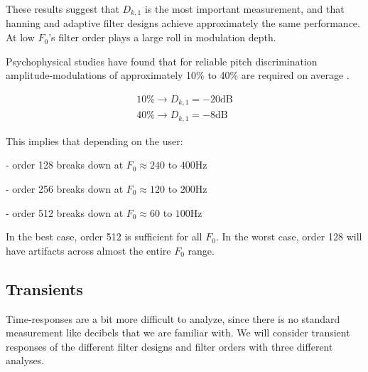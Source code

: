 \documentclass [11pt, proquest,oneside] {ganter_thesis}[2015/03/03]
\begin{document}
These results suggest that $D_{k,1}$ is the most important measurement, and that hanning and adaptive filter designs achieve approximately the same performance.  At low $F_0$'s filter order plays a large roll in modulation depth.

Psychophysical studies have found that for reliable pitch discrimination amplitude-modulations of approximately 10\% to 40\% are required on average \cite{vandali2005pitch}.

\begin{align}
10\% \rightarrow D_{k,1} = -20 \mathrm{dB} \nonumber \\
40\% \rightarrow D_{k,1} = -8 \mathrm{dB} \nonumber
\end{align}

This implies that depending on the user:

- order 128 breaks down at $F_0\approx 240$ to $400$Hz

- order 256 breaks down at $F_0\approx 120$ to $200$Hz

- order 512 breaks down at $F_0\approx 60$ to $100$Hz

In the best case, order 512 is sufficient for all $F_0$.  In the worst case, order 128 will have artifacts across almost the entire $F_0$ range.



\subsection{Transients}

Time-responses are a bit more difficult to analyze, since there is no standard measurement like decibels that we are familiar with.  We will consider transient responses of the different filter designs and filter orders with three different analyses.
\end{document}
